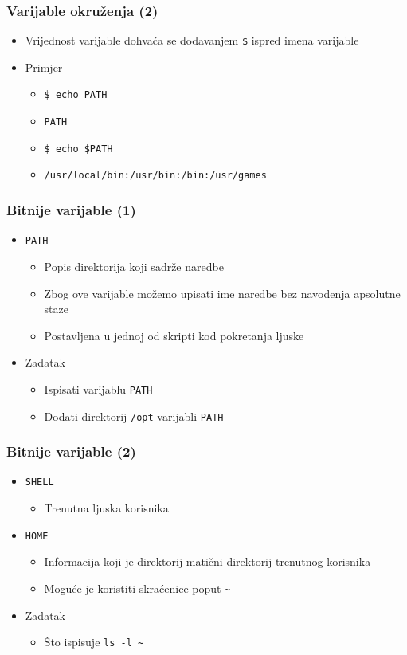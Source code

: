 \documentclass[table,usenames,dvipsnames]{beamer}
\newcommand{\shell}[1]{\texttt{#1}}
\begin{document}
\begin{frame}[t]
\frametitle{Varijable okruženja (2)}
\begin{itemize}
  \item Vrijednost varijable dohvaća se dodavanjem \shell{\$} ispred imena 
        varijable
  \item Primjer
  \begin{itemize}
    \item[] \shell{\$ echo PATH}
    \item[] \shell{PATH}
    \item[] \shell{\$ echo \$PATH}
    \item[] \shell{/usr/local/bin:/usr/bin:/bin:/usr/games}
  \end{itemize}
\end{itemize}
\end{frame}

\begin{frame}[t]
\frametitle{Bitnije varijable (1)}
\begin{itemize}
  \item \shell{PATH}
  \begin{itemize}
    \item Popis direktorija koji sadrže naredbe
    \item Zbog ove varijable možemo upisati ime naredbe bez navođenja 
          apsolutne staze
    \item Postavljena u jednoj od skripti kod pokretanja ljuske
  \end{itemize}
  \item Zadatak
  \begin{itemize}
    \item Ispisati varijablu \shell{PATH}
    \item Dodati direktorij \shell{/opt} varijabli \shell{PATH}
  \end{itemize}
\end{itemize}
\end{frame}

\begin{frame}[t]
\frametitle{Bitnije varijable (2)}
\begin{itemize}
  \item \shell{SHELL}
  \begin{itemize}
    \item Trenutna ljuska korisnika
  \end{itemize}
  \item \shell{HOME}
  \begin{itemize}
    \item Informacija koji je direktorij matični direktorij trenutnog 
          korisnika
    \item Moguće je koristiti skraćenice poput \shell{\~{}} 
  \end{itemize}
  \item Zadatak
  \begin{itemize}
    \item Što ispisuje \shell{ls -l \~{}}
  \end{itemize}
\end{itemize}
\end{frame}
\end{document}
